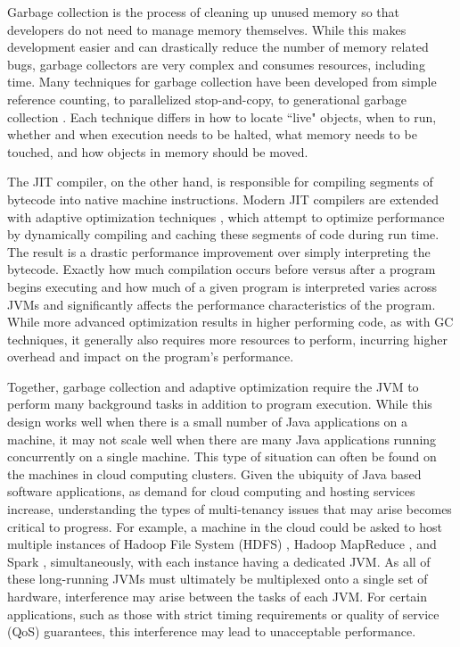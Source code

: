 \documentclass{sig-alternate}
\begin{document}
Garbage collection is the process of cleaning up unused memory so that developers do not need to manage memory themselves. While this makes development easier and can drastically reduce the number of memory related bugs, garbage collectors are very complex and consumes resources, including time. Many techniques for garbage collection have been developed from simple reference counting, to parallelized stop-and-copy, to generational garbage collection \cite{lins1996garbage}. Each technique differs in how to locate ``live" objects, when to run, whether and when execution needs to be halted, what memory needs to be touched, and how objects in memory should be moved.

The JIT compiler, on the other hand, is responsible for compiling segments of bytecode into native machine instructions. Modern JIT compilers are extended with adaptive optimization techniques \cite{suganuma2001dynamic}, which attempt to optimize performance by dynamically compiling and caching these segments of code during run time. The result is a drastic performance improvement over simply interpreting the bytecode. Exactly how much compilation occurs before versus after a program begins executing and how much of a given program is interpreted varies across JVMs and significantly affects the performance characteristics of the program. While more advanced optimization results in higher performing code, as with GC techniques, it generally also requires more resources to perform, incurring higher overhead and impact on the program's performance.

Together, garbage collection and adaptive optimization require the JVM to perform many background tasks in addition to program execution. While this design works well when there is a small number of Java applications on a machine, it may not scale well when there are many Java applications running concurrently on a single machine. This type of situation can often be found on the machines in cloud computing clusters. Given the ubiquity of Java based software applications, as demand for cloud computing and hosting services increase, understanding the types of multi-tenancy issues that may arise becomes critical to progress. For example, a machine in the cloud could be asked to host multiple instances of Hadoop File System (HDFS) \cite{shvachko2010hadoop}, Hadoop MapReduce \cite{bialecki2005hadoop}, and Spark \cite{zaharia2010spark}, simultaneously, with each instance having a dedicated JVM. As all of these long-running JVMs must ultimately be multiplexed onto a single set of hardware, interference may arise between the tasks of each JVM. For certain applications, such as those with strict timing requirements or quality of service (QoS) guarantees, this interference may lead to unacceptable performance.
\end{document}
